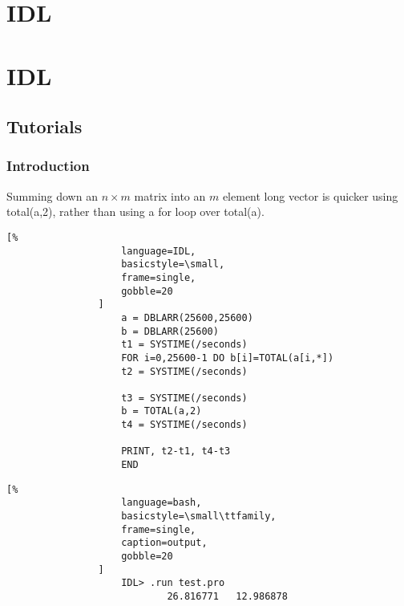\documentclass[crop=false,class=article,oneside]{standalone}
\begin{document}
    \ifx\ifcoursesprogrammingtutorials\undefined
        \section*{IDL}
        \setcounter{section}{3}
    \else
        \section{IDL}
    \fi
    \subsection{Tutorials}
        \subsubsection{Introduction}
            Summing down an $n\times{m}$ matrix into an $m$ element
            long vector is quicker using total(a,2), rather than using
            a for loop over total(a).
            \newline
            \begin{minipage}[t]{.48\textwidth}
                \centering
                \begin{lstlisting}[%
                    language=IDL,
                    basicstyle=\small,
                    frame=single,
                    gobble=20
                ]
                    a = DBLARR(25600,25600)
                    b = DBLARR(25600)
                    t1 = SYSTIME(/seconds)
                    FOR i=0,25600-1 DO b[i]=TOTAL(a[i,*])
                    t2 = SYSTIME(/seconds)
    
                    t3 = SYSTIME(/seconds)
                    b = TOTAL(a,2)
                    t4 = SYSTIME(/seconds)
    
                    PRINT, t2-t1, t4-t3
                    END
                \end{lstlisting}
            \end{minipage}\hfill
            \begin{minipage}[t]{.48\textwidth}
                \centering
                \begin{lstlisting}[%
                    language=bash,
                    basicstyle=\small\ttfamily,
                    frame=single,
                    caption=output,
                    gobble=20
                ]
                    IDL> .run test.pro
                            26.816771   12.986878
                \end{lstlisting}
            \end{minipage}
\end{document}

